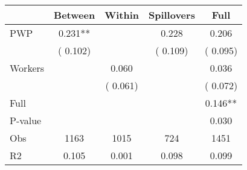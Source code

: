 
\begin{tabular}{l*{4}{c}}\hline&\multicolumn{1}{c}{Between}&\multicolumn{1}{c}{Within}&\multicolumn{1}{c}{Spillovers}&\multicolumn{1}{c}{Full}\\ \hline
 PWP           &              0.231**      &                                               &        0.228 &         0.206                            \\ 
                               &        (       0.102)           &                                       &       (       0.109)     &      (       0.095)                                           \\ 
 Workers       &                                               &        0.060    &                                &             0.036                            \\ 
                               &                                               & (       0.061)                  &                                        &      (       0.072)                                           \\ 
\hline                                                                                                                                                                                                                                            
 Full                  &                                               &                                               &                                        &             0.146**                                     \\ 
 P-value               &                                               &                                               &                                        &             0.030                                           \\ 
 Obs                   &               1163               &       1015                       &       724                &              1451                                               \\ 
 R2                    &                      0.105              &              0.001                      &              0.098               &                     0.099                                              \\ 
\hline \end{tabular}                                                                                                                                                                                                              